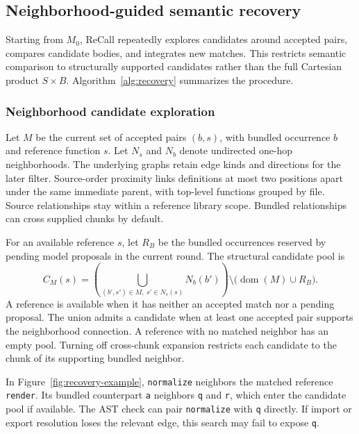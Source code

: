 \subsection{Neighborhood-guided semantic recovery}
\label{sec:semantic-recovery}
Starting from $M_0$, ReCall repeatedly explores candidates around accepted pairs, compares candidate bodies, and integrates new matches. This restricts semantic comparison to structurally supported candidates rather than the full Cartesian product $S\times B$. Algorithm~\ref{alg:recovery} summarizes the procedure.

\subsubsection{Neighborhood candidate exploration}
\label{sec:neighborhoods}
Let $M$ be the current set of accepted pairs $(b,s)$, with bundled occurrence $b$ and reference function $s$. Let $N_s$ and $N_b$ denote undirected one-hop neighborhoods. The underlying graphs retain edge kinds and directions for the later filter. Source-order proximity links definitions at most two positions apart under the same immediate parent, with top-level functions grouped by file. Source relationships stay within a reference library scope. Bundled relationships can cross supplied chunks by default.

For an available reference $s$, let $R_B$ be the bundled occurrences reserved by pending model proposals in the current round. The structural candidate pool is
\begin{equation}
\label{eq:candidate-neighborhood}
C_M(s)=\left(\bigcup_{(b',s')\in M,\ s'\in N_s(s)}N_b(b')\right)
\setminus\bigl(\operatorname{dom}(M)\cup R_B\bigr).
\end{equation}
A reference is available when it has neither an accepted match nor a pending proposal. The union admits a candidate when at least one accepted pair supports the neighborhood connection. A reference with no matched neighbor has an empty pool. Turning off cross-chunk expansion restricts each candidate to the chunk of its supporting bundled neighbor.

In Figure~\ref{fig:recovery-example}, \texttt{normalize} neighbors the matched reference \texttt{render}. Its bundled counterpart \texttt{a} neighbors \texttt{q} and \texttt{r}, which enter the candidate pool if available. The AST check can pair \texttt{normalize} with \texttt{q} directly. If import or export resolution loses the relevant edge, this search may fail to expose \texttt{q}.

